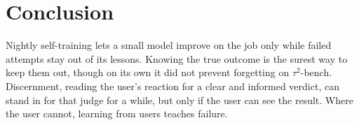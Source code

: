 \section{Conclusion}

Nightly self-training lets a small model improve on the job only while failed attempts stay out of its lessons. Knowing the true outcome is the surest way to keep them out, though on its own it did not prevent forgetting on $\tau^2$-bench. Discernment, reading the user's reaction for a clear and informed verdict, can stand in for that judge for a while, but only if the user can see the result. Where the user cannot, learning from users teaches failure.
